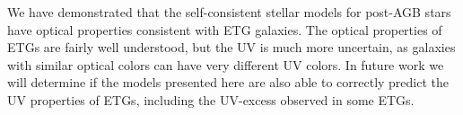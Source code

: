 \documentclass[preprint2]{aastex62}
\begin{document}
We have demonstrated that the self-consistent stellar models for post-AGB stars have optical properties consistent with ETG galaxies. The optical properties of ETGs are fairly well understood, but the UV is much more uncertain, as galaxies with similar optical colors can have very different UV colors. In future work we will determine if the models presented here are also able to correctly predict the UV properties of ETGs, including the UV-excess observed in some ETGs.



\end{document}
